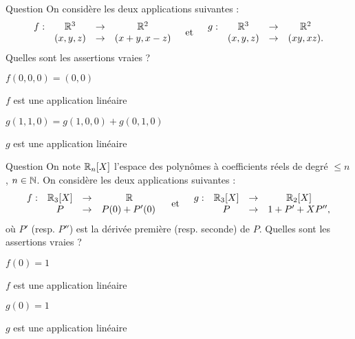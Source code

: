 \begin{multi}[multiple,feedback=
{\(f\) est linéaire. \(g\) ne l'est pas,
puisque \(g((1,0,0)+ (0,1,0)) = g(1,1,0) = (1,0)\) et \( g(1,0,0)+ g(0,1,0) = (0,0)\).
}]{Question}
On considère les deux applications suivantes : 
\[\begin{array}{rccc}f:&\mathbb{R}^3&\to&\mathbb{R}^2\\
& (x,y,z)&\to &(x+y,x-z) \end{array} \quad \mbox{et} \quad \begin{array}{rccc}g:&\mathbb{R}^3&\to&\mathbb{R}^2\\
& (x,y,z)&\to &(xy,xz). \end{array}\] 
Quelles sont les assertions vraies ?

    \item* \(f(0,0,0)=(0,0)\)
    \item* \(f\) est une application linéaire
    \item \(g(1,1,0)=g(1,0,0)+ g(0,1,0)\)
    \item \(g\) est une application linéaire
\end{multi}


\begin{multi}[multiple,feedback=
{On vérifie que \(f\) est linéaire. Par contre, \(g\) ne l'est pas, puisque \(g(0)=1\neq 0\).
}]{Question}
On note \(\mathbb{R}_n[X]\) l'espace des polynômes à coefficients réels de degré \(\le n\),  \(n\in \mathbb{N}\). On considère les deux applications suivantes :
\[\begin{array}{rccc}f:&\mathbb{R}_3[X]&\to&\mathbb{R}\\
& P&\to &P(0)+P'(0)\,  \end{array}   \quad \mbox{et} \quad \begin{array}{rccc}g:&\mathbb{R}_3[X]&\to&\mathbb{R}_2[X]\\
& P&\to &1+P'+XP'',\end{array}\] 
où \(P'\) (resp. \(P''\)) est la dérivée première (resp. seconde) de \(P\). Quelles sont les assertions vraies ?

    \item \(f(0)=1\)
    \item* \(f\) est une application linéaire
    \item* \(g(0)=1\)
    \item \(g\) est une application linéaire
\end{multi}


